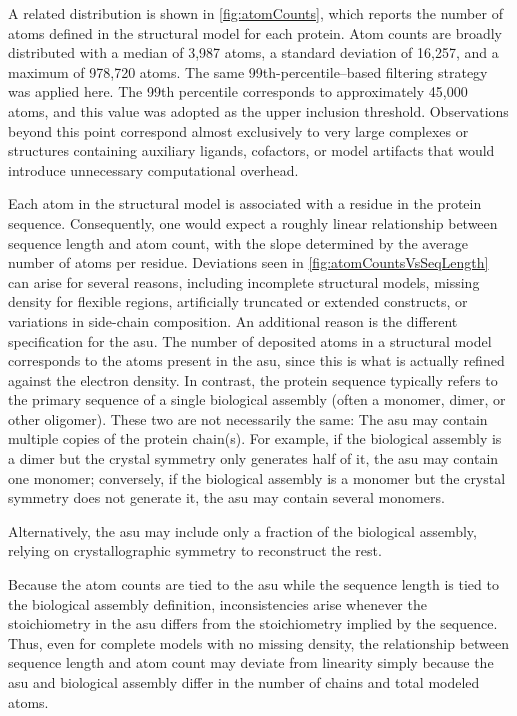A related distribution is shown in \autoref{fig:atomCounts}, which reports the number of atoms defined in the structural model for each protein. Atom counts are broadly distributed with a median of 3,987 atoms, a standard deviation of 16,257, and a maximum of 978,720 atoms. The same 99th-percentile–based filtering strategy was applied here. The 99th percentile corresponds to approximately 45,000 atoms, and this value was adopted as the upper inclusion threshold. Observations beyond this point correspond almost exclusively to very large complexes or structures containing auxiliary ligands, cofactors, or model artifacts that would introduce unnecessary computational overhead.

Each atom in the structural model is associated with a residue in the protein sequence. Consequently, one would expect a roughly linear relationship between sequence length and atom count, with the slope determined by the average number of atoms per residue. Deviations  seen in \autoref{fig:atomCountsVsSeqLength} can arise for several reasons, including incomplete structural models, missing density for flexible regions, artificially truncated or extended constructs, or variations in side-chain composition. An additional reason is the different specification for the \gls{asu}. The number of deposited atoms in a structural model corresponds to the atoms present in the \gls{asu}, since this is what is actually refined against the electron density. In contrast, the protein sequence typically refers to the primary sequence of a single biological assembly (often a monomer, dimer, or other oligomer). These two are not necessarily the same: The \gls{asu} may contain multiple copies of the protein chain(s). For example, if the biological assembly is a dimer but the crystal symmetry only generates half of it, the \gls{asu} may contain one monomer; conversely, if the biological assembly is a monomer but the crystal symmetry does not generate it, the \gls{asu} may contain several monomers.

Alternatively, the \gls{asu} may include only a fraction of the biological assembly, relying on crystallographic symmetry to reconstruct the rest.

Because the atom counts are tied to the \gls{asu} while the sequence length is tied to the biological assembly definition, inconsistencies arise whenever the stoichiometry in the \gls{asu} differs from the stoichiometry implied by the sequence. Thus, even for complete models with no missing density, the relationship between sequence length and atom count may deviate from linearity simply because the \gls{asu} and biological assembly differ in the number of chains and total modeled atoms.


